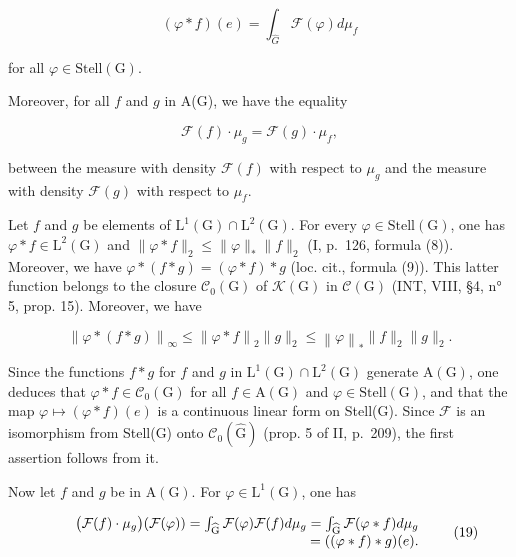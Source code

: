 \[
(\varphi * f) (e) = \int_ {\widehat {G}} \mathcal {F} (\varphi) d \mu_ {f}\tag{17}
\]

for all \(\varphi\in\mathrm{Stell}(\mathrm{G})\).

Moreover, for all \(f\) and \(g\) in A(G), we have the equality

\[
\mathcal {F} (f) \cdot \mu_ {g} = \mathcal {F} (g) \cdot \mu_ {f},\tag{18}
\]

between the measure with density \(\mathcal{F}(f)\) with respect to \(\mu_g\) and the measure with density \(\mathcal{F}(g)\) with respect to \(\mu_f\).

Let \(f\) and \(g\) be elements of \(\mathrm{L}^{1}(\mathrm{G}) \cap \mathrm{L}^{2}(\mathrm{G})\). For every \(\varphi \in \mathrm{Stell}(\mathrm{G})\), one has \(\varphi * f \in \mathrm{L}^{2}(\mathrm{G})\) and \(\| \varphi * f \|_{2} \leqslant \| \varphi \|_{*} \| f \|_{2}\) (I, p.~126, formula (8)). Moreover, we have \(\varphi * (f * g) = (\varphi * f) * g\) (loc. cit., formula (9)). This latter function belongs to the closure \(\mathcal{C}_{0}(\mathrm{G})\) of \(\mathcal{K}(\mathrm{G})\) in \(\mathcal{C}(\mathrm{G})\) (INT, VIII, §4, n° 5, prop. 15). Moreover, we have

\[
\left\| \varphi * (f * g) \right\| _ {\infty} \leqslant \left\| \varphi * f \right\| _ {2} \| g \| _ {2} \leqslant \left\| \varphi \right\| _ {*} \| f \| _ {2} \| g \| _ {2}.
\]

Since the functions \(f * g\) for \(f\) and \(g\) in \(\mathrm{L}^1(\mathrm{G}) \cap \mathrm{L}^2(\mathrm{G})\) generate \(\mathrm{A}(\mathrm{G})\), one deduces that \(\varphi * f \in \mathcal{C}_0(\mathrm{G})\) for all \(f \in \mathrm{A}(\mathrm{G})\) and \(\varphi \in \mathrm{Stell}(\mathrm{G})\), and that the map \(\varphi \mapsto (\varphi * f)(e)\) is a continuous linear form on Stell(G). Since \(\mathcal{F}\) is an isomorphism from Stell(G) onto \(\mathcal{C}_{0}(\widehat{\mathrm{G}})\) (prop. 5 of II, p.~209), the first assertion follows from it.

Now let \(f\) and \(g\) be in \(\mathrm{A}(\mathrm{G})\). For \(\varphi \in \mathrm{L}^1 (\mathrm{G})\), one has

\[
\begin{array}{r l r} & & {\big (\mathcal {F} (f) \cdot \mu_ {g} \big) (\mathcal {F} (\varphi)) = \int_ {\widehat {\mathrm{G}}} \mathcal {F} (\varphi) \mathcal {F} (f) d \mu_ {g} = \int_ {\widehat {\mathrm{G}}} \mathcal {F} (\varphi * f) d \mu_ {g}} \\ & & {= ((\varphi * f) * g) (e).} \end{array}\tag{19}
\]

